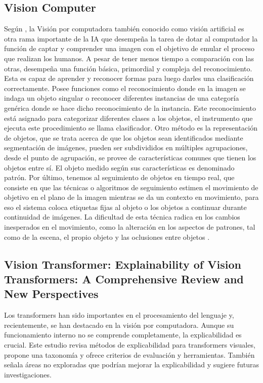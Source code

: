  \subsection{Vision Computer}
 Según \cite{alonso2016vision}, la Visión por computadora también conocido como visión artificial es otra rama importante de la IA que desempeña la tarea de dotar al computador la función de captar y comprender una imagen con el objetivo de emular el proceso que realizan los humanos. A pesar de tener menos tiempo a comparación con las otras, desempeña una función básica, primordial y compleja del reconocimiento. Esta es capaz de aprender y reconocer formas para luego darles una clasificación correctamente.
 Posee funciones como el reconocimiento donde en la imagen se indaga un objeto singular o reconocer diferentes instancias de una categoría genérica donde se hace dicho reconocimiento de la instancia. Este reconocimiento está asignado para categorizar diferentes clases a los objetos, el instrumento que ejecuta este procedimiento se llama clasificador.  Otro método es la representación de objetos, que se trata acerca de que los objetos sean identificados mediante segmentación de imágenes, pueden ser subdivididos en múltiples agrupaciones, desde el punto de agrupación, se provee de características comunes que tienen los objetos entre sí. El objeto medido según sus características es denominado patrón. Por último, tenemos al seguimiento de objetos en tiempo real, que consiste en que las técnicas o algoritmos de seguimiento estimen el movimiento de objetivo en el plano de la imagen mientras se da un contexto en movimiento, para eso el sistema coloca etiquetas fijas al objeto o los objetos a continuar durante continuidad de imágenes. La dificultad de esta técnica radica en los cambios inesperados en el movimiento, como la alteración en los aspectos de patrones, tal como de la escena, el propio objeto y las oclusiones entre objetos \parencite{alonso2016vision}.
 
 \subsection{Vision Transformer: Explainability of Vision Transformers: A Comprehensive Review and New Perspectives \citep*{tecnica1}}
 Los transformers han sido importantes en el procesamiento del lenguaje y, recientemente, se han destacado en la visión por computadora. Aunque su funcionamiento interno no se comprende completamente, la explicabilidad es crucial. Este estudio revisa métodos de explicabilidad para transformers visuales, propone una taxonomía y ofrece criterios de evaluación y herramientas. También señala áreas no exploradas que podrían mejorar la explicabilidad y sugiere futuras investigaciones.
 

